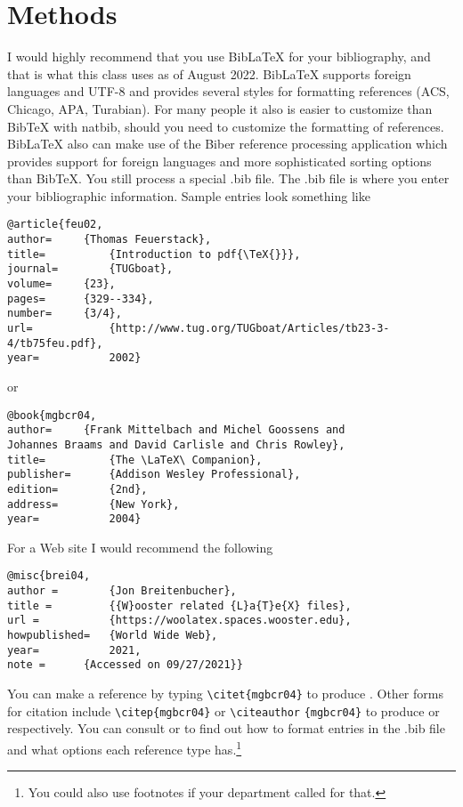 \chapter{Methods}\label{bibind}
I would highly recommend that you use Bib\LaTeX{} for your bibliography, and that is what this class uses as of August 2022. Bib\LaTeX{} supports foreign languages and UTF-8 and provides several styles for formatting references (ACS, Chicago, APA, Turabian). For many people it also is easier to customize than Bib\TeX{} with natbib, should you need to customize the formatting of references. Bib\LaTeX{} also can make use of the Biber reference processing application which provides support for foreign languages and more sophisticated sorting options than Bib\TeX{}. You still process a special .bib file. The .bib file is where you enter your bibliographic information. Sample entries look something like
\begin{singlespace}\small
\begin{verbatim}
@article{feu02,
author=		{Thomas Feuerstack},
title=			{Introduction to pdf{\TeX{}}}, 
journal=		{TUGboat}, 
volume=		{23},
pages=		{329--334},
number=		{3/4},
url=			{http://www.tug.org/TUGboat/Articles/tb23-3-4/tb75feu.pdf},
year=			2002}
\end{verbatim}
\end{singlespace}
or
\begin{singlespace}\small
\begin{verbatim}
@book{mgbcr04,
author=		{Frank Mittelbach and Michel Goossens and
Johannes Braams and David Carlisle and Chris Rowley},
title=			{The \LaTeX\ Companion},
publisher=		{Addison Wesley Professional},
edition=		{2nd},
address=		{New York},
year=			2004}
\end{verbatim}
\end{singlespace}

For a Web site I would recommend the following
\begin{singlespace}\small
\begin{verbatim}
@misc{brei04,
author = 		{Jon Breitenbucher},
title = 		{{W}ooster related {L}a{T}e{X} files},
url = 			{https://woolatex.spaces.wooster.edu},
howpublished=	{World Wide Web},
year=			2021,
note = 		{Accessed on 09/27/2021}}
\end{verbatim}
\end{singlespace}

You can make a reference by typing \verb|\citet{mgbcr04}| to produce \citet{mgbcr04}. Other forms for citation include \verb|\citep{mgbcr04}| or  \verb|\citeauthor| \verb|{mgbcr04}| to produce \citep{mgbcr04} or \citeauthor{mgbcr04} respectively. You can consult \citet{kd03} or \citet{mgbcr04} to find out how to format entries in the .bib file and what options each reference type has.\footnote{You could also use footnotes if your department called for that.}


